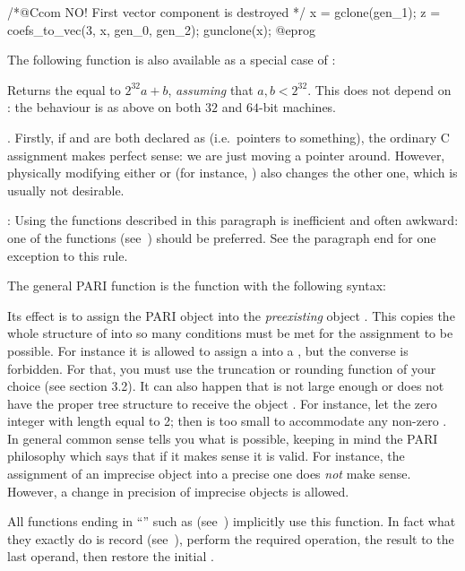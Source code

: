   /*@Ccom NO! First vector component  is destroyed */
  x = gclone(gen_1);
  z = coefs_to_vec(3, x, gen_0, gen_2);
  gunclone(x);
@eprog

\noindent The following function is also available as a special case of
:


Returns the  equal to $2^{32} a + b$, \emph{assuming} that
$a,b < 2^{32}$. This does not depend on : the behaviour is
as above on both $32$ and $64$-bit machines.

.
Firstly, if  and  are both declared as  (i.e.~pointers
to something), the ordinary C assignment  makes perfect sense: we
are just moving a pointer around. However, physically modifying either
 or  (for instance, ) also changes the other
one, which is usually not desirable. \label{se:assign}

: Using the functions described in this
paragraph is inefficient and often awkward: one of the 
functions (see~) should be preferred. See the paragraph
end for one exception to this rule.

\noindent
The general PARI  function is the function  with
the following syntax:


\noindent
Its effect is to assign the PARI object  into the \emph{preexisting}
object . This copies the whole structure of  into  so
many conditions must be met for the assignment to be possible. For instance
it is allowed to assign a  into a , but the converse is
forbidden. For that, you must use the truncation or rounding function of
your choice (see section 3.2). It can also happen that  is not large
enough or does not have the proper tree structure to receive the object
. For instance, let  the zero integer with length equal to 2;
then  is too small to accommodate any non-zero . In general
common sense tells you what is possible, keeping in mind the PARI
philosophy which says that if it makes sense it is valid. For instance, the
assignment of an imprecise object into a precise one does \emph{not} make
sense. However, a change in precision of imprecise objects is allowed.

All functions ending in ``'' such as 
(see~) implicitly use this function. In fact what they
exactly do is record {} (see~), perform the
required operation,  the result to the last operand, then
restore the initial .

